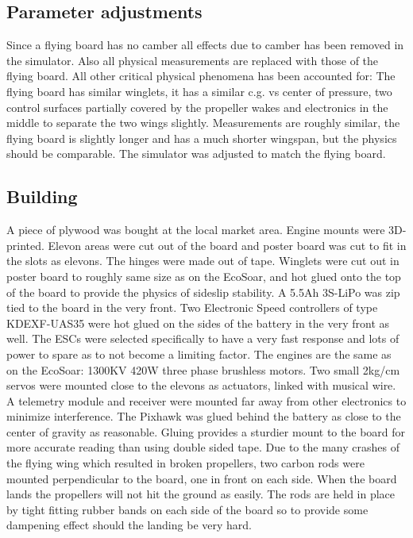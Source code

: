 \documentclass{article}
\begin{document}
\subsection{Parameter adjustments}
Since a flying board has no camber all effects due to camber has been removed in the simulator.
Also all physical measurements are replaced with those of the flying board.
All other critical physical phenomena has been accounted for:
The flying board has similar winglets, it has a similar c.g. vs center of pressure, two control surfaces partially covered by the propeller wakes and electronics in the middle to separate the two wings slightly. 
Measurements are roughly similar, the flying board is slightly longer and has a much shorter wingspan, but the physics should be comparable.
The simulator was adjusted to match the flying board.


\subsection{Building}
A piece of plywood was bought at the local market area.
Engine mounts were 3D-printed.
Elevon areas were cut out of the board and poster board was cut to fit in the slots as elevons.
The hinges were made out of tape.
Winglets were cut out in poster board to roughly same size as on the EcoSoar, and hot glued onto the top of the board to provide the physics of sideslip stability.
A 5.5Ah 3S-LiPo was zip tied to the board in the very front.
Two Electronic Speed controllers of type KDEXF-UAS35 were hot glued on the sides of the battery in the very front as well.
The ESCs were selected specifically to have a very fast response and lots of power to spare as to not become a limiting factor.
The engines are the same as on the EcoSoar: 1300KV 420W three phase brushless motors.
Two small 2kg/cm servos were mounted close to the elevons as actuators, linked with musical wire.
A telemetry module and receiver were mounted far away from other electronics to minimize interference.
The Pixhawk was glued behind the battery as close to the center of gravity as reasonable.
Gluing provides a sturdier mount to the board for more accurate reading than using double sided tape.
Due to the many crashes of the flying wing which resulted in broken propellers, two carbon rods were mounted perpendicular to the board, one in front on each side.
When the board lands the propellers will not hit the ground as easily.
The rods are held in place by tight fitting rubber bands on each side of the board so to provide some dampening effect should the landing be very hard.
\end{document}
